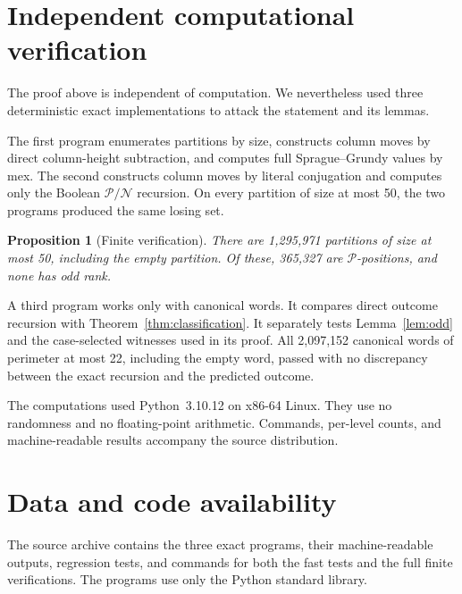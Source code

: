 \documentclass[11pt]{amsart}
\newtheorem{proposition}[theorem]{Proposition}
\theoremstyle{definition}
\newcommand{\cP}{\mathcal P}
\newcommand{\cN}{\mathcal N}
\begin{document}
\section{Independent computational verification}\label{sec:computation}

The proof above is independent of computation.  We nevertheless used three
deterministic exact implementations to attack the statement and its lemmas.

The first program enumerates partitions by size, constructs column moves by
direct column-height subtraction, and computes full Sprague--Grundy values by
mex.  The second constructs column moves by literal conjugation and computes
only the Boolean $\cP/\cN$ recursion.  On every partition of size at most 50,
the two programs produced the same losing set.

\begin{proposition}[Finite verification]
There are 1,295,971 partitions of size at most 50, including the empty
partition.  Of these, 365,327 are $\cP$-positions, and none has odd rank.
\end{proposition}

A third program works only with canonical words.  It compares direct outcome
recursion with Theorem~\ref{thm:classification}.  It separately tests
Lemma~\ref{lem:odd} and the case-selected witnesses used in its proof.  All
2,097,152 canonical words of perimeter at most 22, including the empty word,
passed with no discrepancy between the exact recursion and the predicted
outcome.

The computations used Python~3.10.12 on x86-64 Linux.  They use no randomness
and no floating-point arithmetic.  Commands, per-level counts, and
machine-readable results accompany the source distribution.

\section*{Data and code availability}

The source archive contains the three exact programs, their machine-readable
outputs, regression tests, and commands for both the fast tests and the full
finite verifications.  The programs use only the Python standard library.



\end{document}

